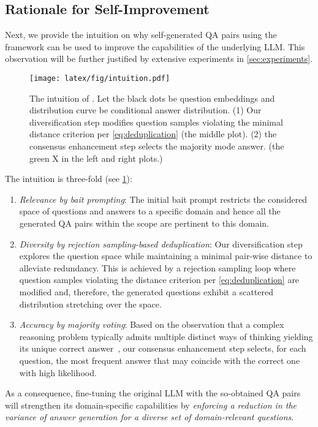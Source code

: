 
\subsection{Rationale for Self-Improvement}\label{sec:rationale}

Next, we provide the intuition on why self-generated QA pairs using the {\langname} framework can be used to improve the capabilities of the underlying LLM. This observation will be further justified by extensive experiments in \cref{sec:experiments}.

\begin{figure}[t]
  \texttt{[image: latex/fig/intuition.pdf]}
  \caption{The intuition of {\langname}. Let the black dots be question embeddings and distribution curve be conditional answer distribution. (1) Our diversification step modifies question samples violating the minimal distance criterion per \cref{eq:deduplication} (the middle plot). (2) the consensus enhancement step selects the majority mode answer. (the green X in the left and right plots.)}
  \label{fig:rationale}
\end{figure}

The intuition is three-fold (see \cref{fig:rationale}):
\begin{enumerate}[label=(\roman*)]
    \item \emph{Relevance by bait prompting}: The initial bait prompt restricts the considered space of questions and answers to a specific domain and hence all the generated QA pairs within the {\langname} scope are pertinent to this domain.
    \item \emph{Diversity by rejection sampling-based deduplication}: Our diversification step explores the question space while maintaining a minimal pair-wise distance 
    to alleviate redundancy. This is achieved by a rejection sampling loop where question samples violating the distance criterion per \cref{eq:deduplication} are modified and, therefore, the generated questions exhibit a scattered distribution stretching over the space.
    \item \emph{Accuracy by majority voting}: Based on the observation that a complex reasoning problem typically admits multiple distinct ways of thinking yielding its unique correct answer~\citep{DBLP:conf/iclr/0002WSLCNCZ23}, our consensus enhancement step selects, for each question, the most frequent answer that may coincide with the correct one with high likelihood.
\end{enumerate}
As a consequence, fine-tuning the original LLM with the so-obtained QA pairs will strengthen its domain-specific capabilities by \emph{enforcing a reduction in the variance of answer generation for a diverse set of domain-relevant questions}.

